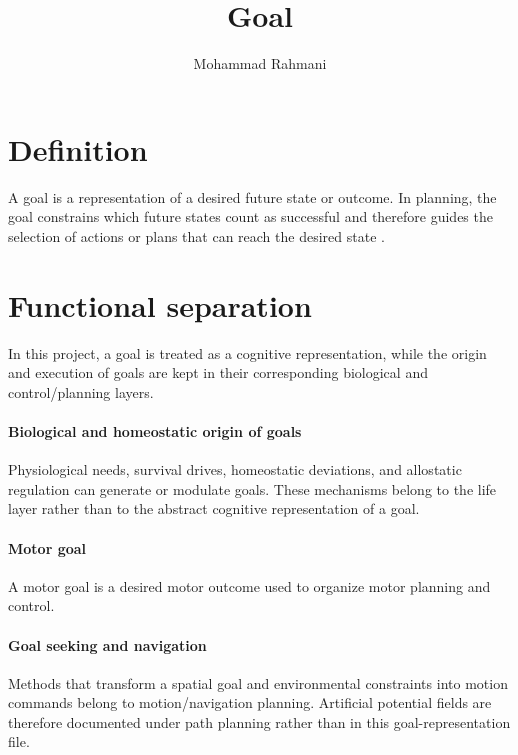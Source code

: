 \documentclass[a4paper]{article}
\title{Goal}
\date{}
\author{Mohammad Rahmani}
\begin{document}
   \maketitle

   \section{Definition}
      A goal is a representation of a desired future state or outcome. In planning, the goal constrains which future states count as successful and therefore guides the selection of actions or plans that can reach the desired state \cite{mcdermott-1999-using-regression-match-graphs-to-control-search-in-planning}.

   \section{Functional separation}
      In this project, a goal is treated as a cognitive representation, while the origin and execution of goals are kept in their corresponding biological and control/planning layers.

      \paragraph{Biological and homeostatic origin of goals}
      Physiological needs, survival drives, homeostatic deviations, and allostatic regulation can generate or modulate goals. These mechanisms belong to the life layer rather than to the abstract cognitive representation of a goal.


      \paragraph{Motor goal}
      A motor goal is a desired motor outcome used to organize motor planning and control.


      \paragraph{Goal seeking and navigation}
      Methods that transform a spatial goal and environmental constraints into motion commands belong to motion/navigation planning. Artificial potential fields are therefore documented under path planning rather than in this goal-representation file.


   
   
\end{document}
